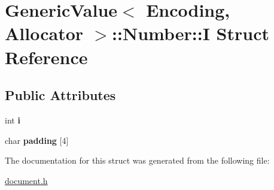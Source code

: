 \hypertarget{a02100}{}\section{Generic\+Value$<$ Encoding, Allocator $>$\+:\+:Number\+:\+:I Struct Reference}
\label{a02100}
\subsection*{Public Attributes}
\begin{DoxyCompactItemize}
\item 
\mbox{\label{a02100_ae0b250dc448d284cf9019f3932bfc380}} 
int {\bfseries i}
\item 
\mbox{\label{a02100_aefc064997f30c9c0b2bdce187d1d4cce}} 
char {\bfseries padding} \mbox{[}4\mbox{]}
\end{DoxyCompactItemize}


The documentation for this struct was generated from the following file\+:\begin{DoxyCompactItemize}
\item 
\hyperlink{a00476}{document.\+h}\end{DoxyCompactItemize}
